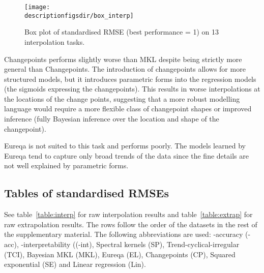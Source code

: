 \begin{figure*}[ht]
\centering
\texttt{[image: \\descriptionfigsdir/box\_interp]}
\caption[RMSE comparison of \procedurename{} and other algorithms at interpolation.]{
Box plot of standardised RMSE (best performance = 1) on 13 interpolation tasks.
}
\label{fig:box_interp}
\end{figure*}

Changepoints performs slightly worse than MKL despite being strictly more general than Changepoints.
The introduction of changepoints allows for more structured models, but it introduces parametric forms into the regression models (\ie the sigmoids expressing the changepoints).
This results in worse interpolations at the locations of the change points, suggesting that a more robust modelling language would require a more flexible class of changepoint shapes or improved inference (\eg fully Bayesian inference over the location and shape of the changepoint).

Eureqa is not suited to this task and performs poorly.
The models learned by Eureqa tend to capture only broad trends of the data since the fine details are not well explained by parametric forms.

\subsection{Tables of standardised RMSEs}

See table~\ref{table:interp} for raw interpolation results and table~\ref{table:extrap} for raw extrapolation results. 
The rows follow the order of the datasets in the rest of the supplementary material.
The following abbreviations are used: \procedurename{}-accuracy (\procedurename{}-acc), \procedurename{}-interpretability ((\procedurename{}-int), Spectral kernels (SP), Trend-cyclical-irregular (TCI), Bayesian MKL (MKL), Eureqa (EL), Changepoints (CP), Squared exponential (SE) and Linear regression (Lin).

